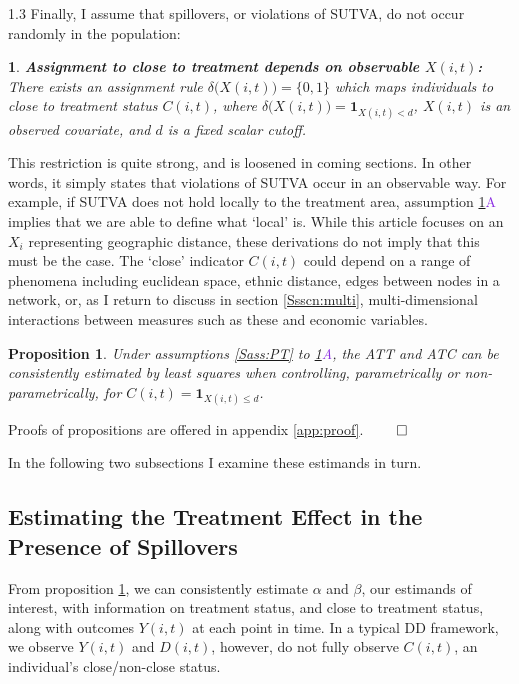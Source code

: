 \documentclass[12pt]{article}
\makeatletter
\newtheorem{proposition}{Proposition}
\newtheorem*{assumption*}{\assumptionnumber}
\providecommand{\assumptionnumber}{}
\newenvironment{assumption}[2]
 {%
  \renewcommand{\assumptionnumber}{Assumption #1{#2}}%
  \begin{assumption*}%
  \protected@edef\@currentlabel{#1}%
 }
 {%
  \end{assumption*}
 }
\newcommand{\asref}[2]{\ref{#1}{\textcolor{BlueViolet}{#2}}}
\makeatother
\begin{document}
\begin{spacing}{1.3}
Finally, I assume that spillovers, or violations of SUTVA, do not occur randomly
in the population:
\begin{assumption}{4}{A}
\label{Sass:SUTVAl}
\textbf{Assignment to close to treatment depends on observable $X(i,t)$:} \\ 
There exists an assignment rule $\delta\Big(X(i,t)\Big)=\{0,1\}$ which maps 
individuals to close to treatment status $C(i,t)$, where $\delta\Big(X(i,t)\Big)=
\mathbf{1}_{X(i,t)<d}$, $X(i,t)$ is an observed covariate, and $d$ is a fixed
scalar cutoff. 
\end{assumption}
\vspace{-4mm}
\noindent This restriction is quite strong, and is loosened in coming sections.  
In other words, it simply states 
that violations of SUTVA occur in an observable way.  For example, if SUTVA does
not hold locally to the treatment area, assumption \asref{Sass:SUTVAl}{A} implies
that we are able to define what `local' is.  While this article focuses on
an $X_i$ representing geographic distance, these derivations do not imply that 
this must be the case.  The `close' indicator $C(i,t)$ could depend on a range 
of phenomena including euclidean space, ethnic distance, edges between
nodes in a network, or, as I return to discuss in section \ref{Ssscn:multi}, 
multi-dimensional interactions between measures such as these and economic 
variables. 
\begin{proposition}
\label{Pass:ATT}
Under assumptions \ref{Sass:PT} to \asref{Sass:SUTVAl}{A}, the ATT and ATC can be 
consistently estimated by least squares when controlling, parametrically or
non-parametrically, for $C(i,t)=\mathbf{1}_{X(i,t)\leq d}$.
\end{proposition}
\noindent Proofs of propositions are offered in appendix \ref{app:proof}. $\qed$

In the following two subsections I examine these estimands in turn. 

\subsection{Estimating the Treatment Effect in the Presence of Spillovers}
\label{Ssscn:TE}
From proposition \ref{Pass:ATT}, we can consistently estimate $\alpha$ and 
$\beta$, our estimands of interest, with information on treatment status, and 
close to treatment status, along with outcomes $Y(i,t)$ at each point in time. In 
a typical DD framework, we observe $Y(i,t)$ and $D(i,t)$, however, do not fully 
observe $C(i,t)$, an individual's close/non-close status.


\end{spacing}
\end{document}
